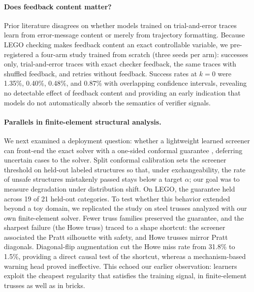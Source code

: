 \documentclass{article}
\begin{document}
\paragraph{Does feedback content matter?}
Prior literature disagrees on whether models trained on trial-and-error traces learn from error-message content or merely from trajectory formatting. Because LEGO checking makes feedback content an exact controllable variable, we pre-registered a four-arm study trained from scratch (three seeds per arm): successes only, trial-and-error traces with exact checker feedback, the same traces with shuffled feedback, and retries without feedback. Success rates at $k{=}0$ were 1.35\%, 0.40\%, 0.48\%, and 0.87\% with overlapping confidence intervals, revealing no detectable effect of feedback content and providing an early indication that models do not automatically absorb the semantics of verifier signals.

\paragraph{Parallels in finite-element structural analysis.}
We next examined a deployment question: whether a lightweight learned screener can front-end the exact solver with a one-sided conformal guarantee \cite{angelopoulos2021gentle}, deferring uncertain cases to the solver. Split conformal calibration sets the screener threshold on held-out labeled structures so that, under exchangeability, the rate of unsafe structures mistakenly passed stays below a target $\alpha$; our goal was to measure degradation under distribution shift. On LEGO, the guarantee held across 19 of 21 held-out categories. To test whether this behavior extended beyond a toy domain, we replicated the study on steel trusses analyzed with our own finite-element solver. Fewer truss families preserved the guarantee, and the sharpest failure (the Howe truss) traced to a shape shortcut: the screener associated the Pratt silhouette with safety, and Howe trusses mirror Pratt diagonals. Diagonal-flip augmentation cut the Howe miss rate from 31.8\% to 1.5\%, providing a direct causal test of the shortcut, whereas a mechanism-based warning head proved ineffective. This echoed our earlier observation: learners exploit the cheapest regularity that satisfies the training signal, in finite-element trusses as well as in bricks.
\end{document}
